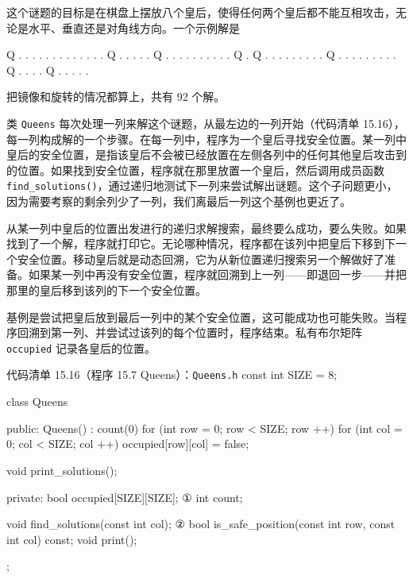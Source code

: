 这个谜题的目标是在棋盘上摆放八个皇后，使得任何两个皇后都不能互相攻击，无论是水平、垂直还是对角线方向。一个示例解是

\begin{codebox}
Q . . . . . . . 
. . . . . . Q . 
. . . . Q . . . 
. . . . . . . Q 
. Q . . . . . . 
. . . Q . . . . 
. . . . . Q . . 
. . Q . . . . . 
\end{codebox}

把镜像和旋转的情况都算上，共有 92 个解。

类 \texttt{Queens} 每次处理一列来解这个谜题，从最左边的一列开始（代码清单 15.16），每一列构成解的一个步骤。在每一列中，程序为一个皇后寻找安全位置。某一列中皇后的安全位置，是指该皇后不会被已经放置在左侧各列中的任何其他皇后攻击到的位置。如果找到安全位置，程序就在那里放置一个皇后，然后调用成员函数 \texttt{find\_\allowbreak{}solutions(\allowbreak{})\allowbreak{}}，通过递归地测试下一列来尝试解出谜题。这个子问题更小，因为需要考察的剩余列少了一列，我们离最后一列这个基例也更近了。

从某一列中皇后的位置出发进行的递归求解搜索，最终要么成功，要么失败。如果找到了一个解，程序就打印它。无论哪种情况，程序都在该列中把皇后下移到下一个安全位置。移动皇后就是动态回溯，它为从新位置递归搜索另一个解做好了准备。如果某一列中再没有安全位置，程序就回溯到上一列——即退回一步——并把那里的皇后移到该列的下一个安全位置。

基例是尝试把皇后放到最后一列中的某个安全位置，这可能成功也可能失败。当程序回溯到第一列、并尝试过该列的每个位置时，程序结束。私有布尔矩阵 \texttt{occupied} 记录各皇后的位置。

\begin{codeboxt}{代码清单 15.16（程序 15.7 Queens）：\texttt{Queens.h}}
const int SIZE = 8;

class Queens
{
public:
    Queens() : count(0)
    {
        for (int row = 0; row < SIZE; row ++)
        {
            for (int col = 0; col < SIZE; col ++)
            {
                occupied[row][col] = false;
            }
        }
    }

    void print_solutions();

private:
    bool occupied[SIZE][SIZE];                               ①
    int count;

    void find_solutions(const int col);                      ②
    bool is_safe_position(const int row, const int col) const;
    void print();
};
\end{codeboxt}
\par
{}\par

